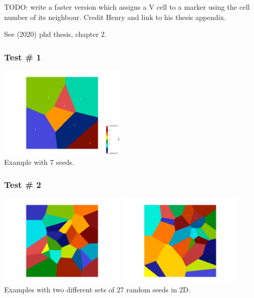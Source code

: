 TODO: write a faster version which assigns a V cell to a marker using the cell number of its neighbour. 
Credit Henry and link to his thesis appendix.

See \textcite{furstoss} (2020) phd thesis, chapter 2.

\subsubsection*{Test \# 1}

\begin{center}
\includegraphics[width=6cm]{python_codes/fieldstone_125/results/diagram.png}\\
{\captionfont Example with 7 seeds.}
\end{center}


\subsubsection*{Test \# 2}

\begin{center}
\includegraphics[width=6cm]{python_codes/fieldstone_125/results/test2_a}
\includegraphics[width=6cm]{python_codes/fieldstone_125/results/test2_b}\\
{\captionfont Examples with two different sets of 27 random seeds in 2D.}
\end{center}

